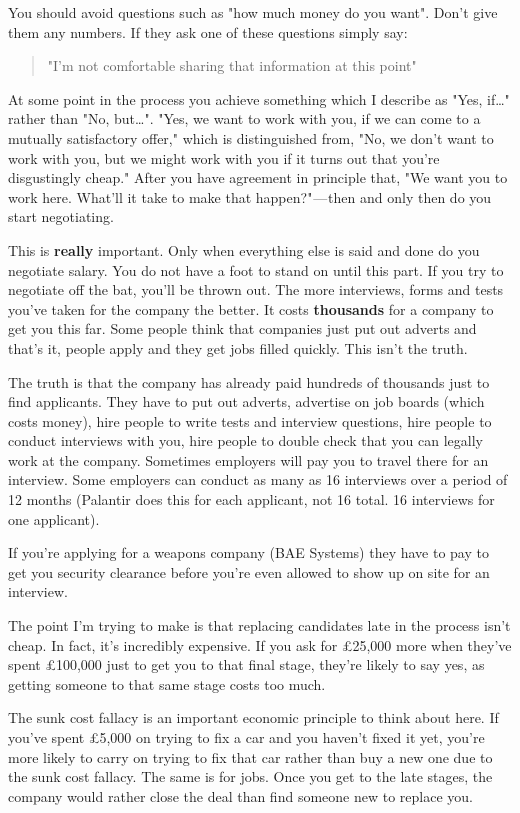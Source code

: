 \documentclass{article}
\begin{document}
You should avoid questions such as "how much money do you want". Don't
give them any numbers. If they ask one of these questions simply say:
\begin{quote}
    "I'm not comfortable sharing that information at this point"
\end{quote}
At some point in the process you achieve something which I describe as
"Yes, if\ldots" rather than "No, but\ldots". "Yes, we want to work
with you, if we can come to a mutually satisfactory offer," which is
distinguished from, "No, we don't want to work with you, but we might
work with you if it turns out that you're disgustingly cheap." After
you have agreement in principle that, "We want you to work here.
What'll it take to make that happen?" --- then and only then do you
start negotiating.

This is \textbf{really} important. Only when everything else is said and
done do you negotiate salary. You do not have a foot to stand on until
this part. If you try to negotiate off the bat, you'll be thrown out.
The more interviews, forms and tests you've taken for the company the
better. It costs \textbf{thousands} for a company to get you this far.
Some people think that companies just put out adverts and that's it,
people apply and they get jobs filled quickly. This isn't the truth.

The truth is that the company has already paid hundreds of thousands
just to find applicants. They have to put out adverts, advertise on job
boards (which costs money), hire people to write tests and interview
questions, hire people to conduct interviews with you, hire people to
double check that you can legally work at the company. Sometimes
employers will pay you to travel there for an interview. Some employers
can conduct as many as 16 interviews over a period of 12 months
(Palantir does this for each applicant, not 16 total. 16 interviews for
one applicant).

If you're applying for a weapons company (BAE Systems) they have to pay
to get you security clearance before you're even allowed to show up on
site for an interview.

The point I'm trying to make is that replacing candidates late in the
process isn't cheap. In fact, it's incredibly expensive. If you ask for
£25,000 more when they've spent £100,000 just to get you to that final
stage, they're likely to say yes, as getting someone to that same stage
costs too much.

The sunk cost fallacy is an important economic principle to think about
here. If you've spent £5,000 on trying to fix a car and you haven't
fixed it yet, you're more likely to carry on trying to fix that car
rather than buy a new one due to the sunk cost fallacy. The same is for
jobs. Once you get to the late stages, the company would rather close
the deal than find someone new to replace you.
\end{document}
